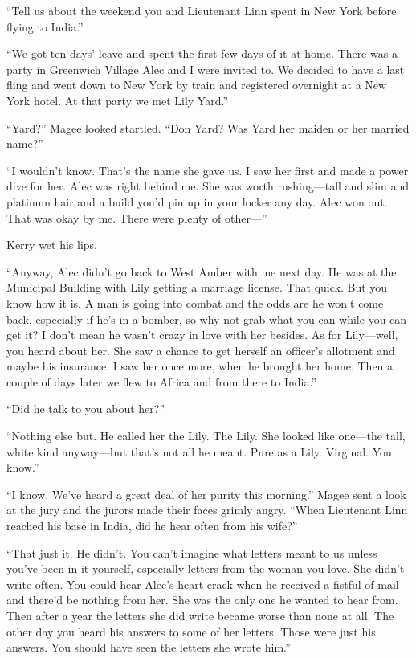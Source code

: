 \documentclass{novel}
\begin{document}
“Tell us about the weekend you and Lieutenant Linn spent in New York before flying to India.”

“We got ten days’ leave and spent the first few days of it at home. There was a party in Greenwich Village Alec and I were invited to. We decided to have a last fling and went down to New York by train and registered overnight at a New York hotel. At that party we met Lily Yard.”

“Yard?” Magee looked startled. “Don Yard? Was Yard her maiden or her married name?”

“I wouldn’t know. That’s the name she gave us. I saw her first and made a power dive for her. Alec was right behind me. She was worth rushing—tall and slim and platinum hair and a build you’d pin up in your locker any day. Alec won out. That was okay by me. There were plenty of other—” 

Kerry wet his lips.

“Anyway, Alec didn’t go back to West Amber with me next day. He was at the Municipal Building with Lily getting a marriage license. That quick. But you know how it is. A man is going into combat and the odds are he won’t come back, especially if he’s in a bomber, so why not grab what you can while you can get it? I don’t mean he wasn’t crazy in love with her besides. As for Lily—well, you heard about her. She saw a chance to get herself an officer’s allotment and maybe his insurance. I saw her once more, when he brought her home. Then a couple of days later we flew to Africa and from there to India.”

“Did he talk to you about her?”

“Nothing else but. He called her the Lily. The Lily. She looked like one—the tall, white kind anyway—but that’s not all he meant. Pure as a Lily. Virginal. You know.”

“I know. We’ve heard a great deal of her purity this morning.” Magee sent a look at the jury and the jurors made their faces grimly angry. “When Lieutenant Linn reached his base in India, did he hear often from his wife?”

“That just it. He didn’t. You can’t imagine what letters meant to us unless you’ve been in it yourself, especially letters from the woman you love. She didn’t write often. You could hear Alec’s heart crack when he received a fistful of mail and there’d be nothing from her. She was the only one he wanted to hear from. Then after a year the letters she did write became worse than none at all. The other day you heard his answers to some of her letters. Those were just his answers. You should have seen the letters she wrote him.”
\end{document}
